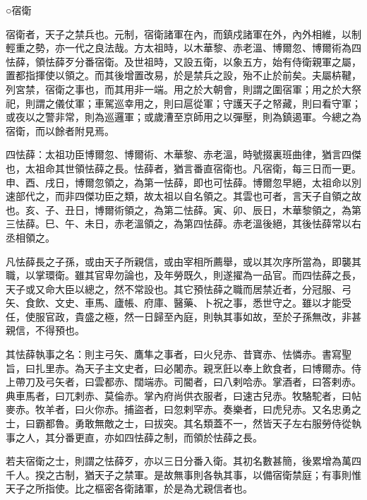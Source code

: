 
\begin{pinyinscope}

 ○宿衛



 宿衛者，天子之禁兵也。元制，宿衛諸軍在內，而鎮戍諸軍在外，內外相維，以制輕重之勢，亦一代之良法哉。方太祖時，以木華黎、赤老溫、博爾忽、博爾術為四怯薛，領怯薛歹分番宿衛。及世祖時，又設五衛，以象五方，始有侍衛親軍之屬，置都指揮使以領之。而其後增置改易，於是禁兵之設，殆不止於前矣。夫屬枿鞬，列宮禁，宿衛之事也，而其用非一端。用之於大朝會，則謂之圍宿軍；用之於大祭祀，則謂之儀仗軍；車駕巡幸用之，則曰扈從軍；守護天子之帑藏，則曰看守軍；或夜以之警非常，則為巡邏軍；或歲漕至京師用之以彈壓，則為鎮遏軍。今總之為宿衛，而以餘者附見焉。



 四怯薛：太祖功臣博爾忽、博爾術、木華黎、赤老溫，時號掇裏班曲律，猶言四傑也，太祖命其世領怯薛之長。怯薛者，猶言番直宿衛也。凡宿衛，每三日而一更。申、酉、戌日，博爾忽領之，為第一怯薛，即也可怯薛。博爾忽早絕，太祖命以別速部代之，而非四傑功臣之類，故太祖以自名領之。其雲也可者，言天子自領之故也。亥、子、丑日，博爾術領之，為第二怯薛。寅、卯、辰日，木華黎領之，為第三怯薛。巳、午、未日，赤老溫領之，為第四怯薛。赤老溫後絕，其後怯薛常以右丞相領之。



 凡怯薛長之子孫，或由天子所親信，或由宰相所薦舉，或以其次序所當為，即襲其職，以掌環衛。雖其官卑勿論也，及年勞既久，則遂擢為一品官。而四怯薛之長，天子或又命大臣以總之，然不常設也。其它預怯薛之職而居禁近者，分冠服、弓矢、食飲、文史、車馬、廬帳、府庫、醫藥、卜祝之事，悉世守之。雖以才能受任，使服官政，貴盛之極，然一日歸至內庭，則執其事如故，至於子孫無改，非甚親信，不得預也。



 其怯薛執事之名：則主弓矢、鷹隼之事者，曰火兒赤、昔寶赤、怯憐赤。書寫聖旨，曰扎里赤。為天子主文史者，曰必闍赤。親烹飪以奉上飲食者，曰博爾赤。侍上帶刀及弓矢者，曰雲都赤、闊端赤。司閽者，曰八剌哈赤。掌酒者，曰答剌赤。典車馬者，曰兀剌赤、莫倫赤。掌內府尚供衣服者，曰速古兒赤。牧駱駝者，曰帖麥赤。牧羊者，曰火你赤。捕盜者，曰忽剌罕赤。奏樂者，曰虎兒赤。又名忠勇之士，曰霸都魯。勇敢無敵之士，曰拔突。其名類蓋不一，然皆天子左右服勞侍從執事之人，其分番更直，亦如四怯薛之制，而領於怯薛之長。



 若夫宿衛之士，則謂之怯薛歹，亦以三日分番入衛。其初名數甚簡，後累增為萬四千人。揆之古制，猶天子之禁軍。是故無事則各執其事，以備宿衛禁庭；有事則惟天子之所指使。比之樞密各衛諸軍，於是為尤親信者也。




\end{pinyinscope}

